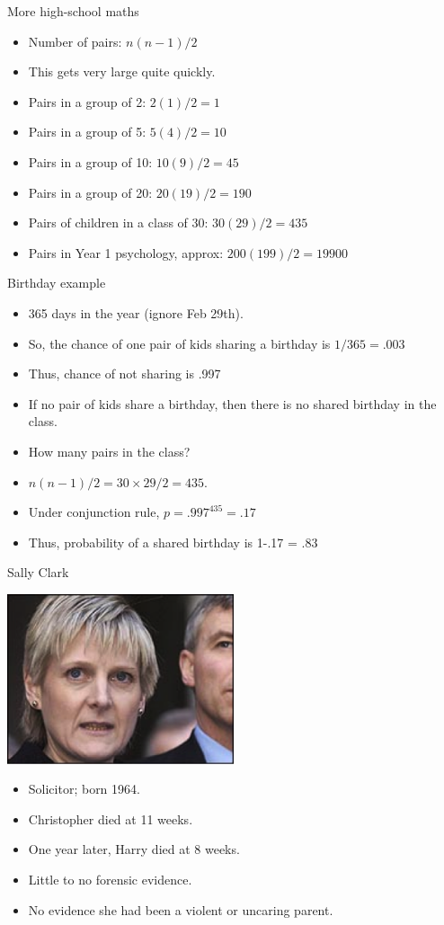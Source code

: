 \documentclass{beamer}
\begin{document}
\begin{frame}{More high-school maths}
\begin{itemize}
\item Number of pairs: $n(n-1)/2$
\item This gets very large quite quickly.
\item Pairs in a group of 2: $2(1)/2 = 1$
\item Pairs in a group of 5: $5(4)/2 = 10$
\item Pairs in a group of 10: $10(9)/2 = 45$
\item Pairs in a group of 20: $20(19)/2 = 190$
\item Pairs of children in a class of 30: $30(29)/2 = 435$
\item Pairs in Year 1 psychology, approx: $200(199)/2 = 19900$
\end{itemize}
\end{frame}

\begin{frame}{Birthday example}
	\begin{itemize} 
		\item 365 days in the year (ignore Feb 29th).
		\item So, the chance of one pair of kids sharing a birthday is $1/365 = .003$
		\item Thus, chance of not sharing is .997
		\item If no pair of kids share a birthday, then there is no shared birthday in the class.
		\item How many pairs in the class?
		\item $n(n-1)/2 = 30 \times 29/2 = 435$.	
		\item Under conjunction rule, $p = .997^{435} = .17$
		\item Thus, probability of a shared birthday is 1-.17 = .83	
	\end{itemize}
\end{frame}

\begin{frame}{Sally Clark}
\centerline{\includegraphics[width=0.5\textwidth]{pics/sallyclark.png}}
\begin{itemize}
\item Solicitor; born 1964.
\item Christopher died at 11 weeks.
\item One year later, Harry died at 8 weeks.
\item Little to no forensic evidence.
\item No evidence she had been a violent or uncaring parent.
\end{itemize}
\end{frame}
\end{document}
